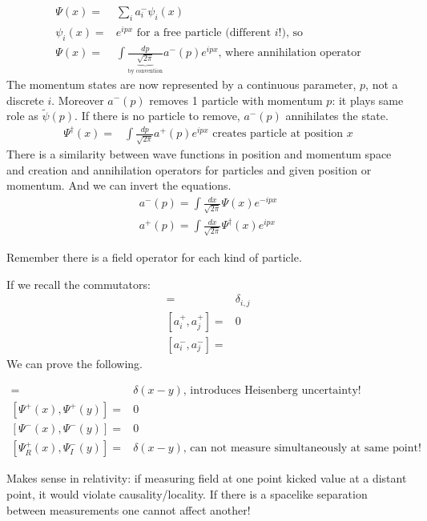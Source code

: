\documentclass[]{article}
\begin{document}
\begin{align*}
	\Psi(x) =& \sum_{i} a^-_i \psi_i(x)\\
	\psi_i(x) =& e^{ipx} \text{ for a free particle (different $i$!), so} \\
	\Psi(x)=& \int \frac{dp}{\underbrace{\sqrt{2\pi}}_\text{by convention}} a^-(p) e^{ipx} \text{, where annihilation operator}
\end{align*}
The momentum states are now represented by a continuous parameter, $p$, not a discrete $i$. Moreover $a^-(p)$  removes 1 particle with momentum $p$: it plays same role as $\widetilde{\psi}(p)$. If there is no particle to remove, $a^-(p)$ annihilates the state.
\begin{align*}
	\Psi^\dagger(x)=& \int \frac{dp}{\sqrt{2\pi}} a^+(p) e^{ipx} \text{ creates particle at position $x$}
\end{align*}
There is a similarity between wave functions in position and momentum space and creation and annihilation operators for particles and given position or momentum. And we can invert the equations.
\begin{align*}
	a^-(p) = \int \frac{dx}{\sqrt{2\pi}} \Psi(x) e^{-ipx}\\
	a^+(p) = \int \frac{dx}{\sqrt{2\pi}} \Psi^\dagger(x) e^{ipx}
\end{align*}

Remember there is a field operator for each kind of particle.

If we recall the commutators:
\begin{align*}
	[a^+_i,a^-_j] =& \delta_{i,j}\\
	[a^+_i,a^+_j] =& 0\\
	[a^-_i,a^-_j] =& 
\end{align*}
We can prove the following.
 
\begin{align*}
	[\Psi^+(x),\Psi^-(y)] =& \delta(x-y) \text{, introduces Heisenberg uncertainty!}\\
	[\Psi^+(x),\Psi^+(y)] =&0 \\
	[\Psi^-(x),\Psi^-(y)] =&0\\
	[\Psi^+_R(x),\Psi^-_I(y)] =& \delta(x-y) \text{, can not measure simultaneously at same point!}
\end{align*}

Makes sense in relativity: if measuring field at one point kicked value at a distant point, it would violate causality/locality. If there is a spacelike separation between measurements one cannot affect another!
\end{document}
